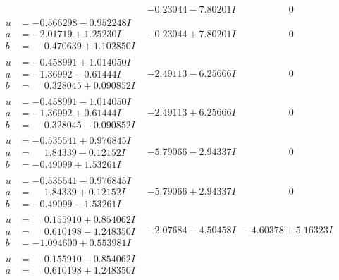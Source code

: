 \documentclass[1p]{elsarticle_modified}
\theoremstyle{definition}
\begin{document}
$$\begin{array}{c|c|c}
 & -0.23044 - 7.80201 I & \phantom{-0.000000 } 0 \\ \hline\begin{aligned}
u &= -0.566298 - 0.952248 I \\
a &= -2.01719 + 1.25230 I \\
b &= \phantom{-}0.470639 + 1.102850 I\end{aligned}
 & -0.23044 + 7.80201 I & \phantom{-0.000000 } 0 \\ \hline\begin{aligned}
u &= -0.458991 + 1.014050 I \\
a &= -1.36992 - 0.61444 I \\
b &= \phantom{-}0.328045 + 0.090852 I\end{aligned}
 & -2.49113 - 6.25666 I & \phantom{-0.000000 } 0 \\ \hline\begin{aligned}
u &= -0.458991 - 1.014050 I \\
a &= -1.36992 + 0.61444 I \\
b &= \phantom{-}0.328045 - 0.090852 I\end{aligned}
 & -2.49113 + 6.25666 I & \phantom{-0.000000 } 0 \\ \hline\begin{aligned}
u &= -0.535541 + 0.976845 I \\
a &= \phantom{-}1.84339 - 0.12152 I \\
b &= -0.49099 + 1.53261 I\end{aligned}
 & -5.79066 - 2.94337 I & \phantom{-0.000000 } 0 \\ \hline\begin{aligned}
u &= -0.535541 - 0.976845 I \\
a &= \phantom{-}1.84339 + 0.12152 I \\
b &= -0.49099 - 1.53261 I\end{aligned}
 & -5.79066 + 2.94337 I & \phantom{-0.000000 } 0 \\ \hline\begin{aligned}
u &= \phantom{-}0.155910 + 0.854062 I \\
a &= \phantom{-}0.610198 - 1.248350 I \\
b &= -1.094600 + 0.553981 I\end{aligned}
 & -2.07684 - 4.50458 I & -4.60378 + 5.16323 I \\ \hline\begin{aligned}
u &= \phantom{-}0.155910 - 0.854062 I \\
a &= \phantom{-}0.610198 + 1.248350 I \\

\end{aligned}
\end{array}$$
\end{document}
